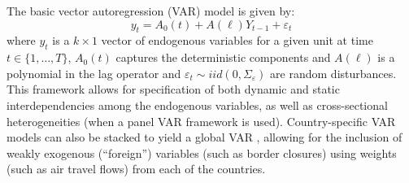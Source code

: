 \documentclass[preprint, 12pt]{elsarticle}
\newcommand{\?}{\stackrel{?}{=}}
\begin{document}



The basic vector autoregression (VAR) model is given by:
\begin{equation}
  \label{eq:6}
  y_{t} = A_{0}(t) + A(\ell)Y_{t-1} + \varepsilon_{t}
\end{equation}
where $y_{t}$ is a $k\times 1$ vector of endogenous variables for a given unit at time $t\in \{1,\ldots, T\}$,
$A_{0}(t)$ captures the deterministic components and 
$A(\ell)$ is a polynomial in the lag operator and $\varepsilon_{t}\sim iid(0,\Sigma_{\varepsilon})$ are random disturbances.
This framework allows for specification of both dynamic and static interdependencies
among the endogenous variables, as well as cross-sectional heterogeneities (when a panel VAR framework is used).
Country-specific VAR models can also be stacked to yield a global VAR  \cite{martin2017weighting,dees2007exploring,covid19b}, allowing for the inclusion of weakly exogenous (``foreign'') variables (such as border closures) using weights (such as air travel flows) from each of the countries.

\end{document}
